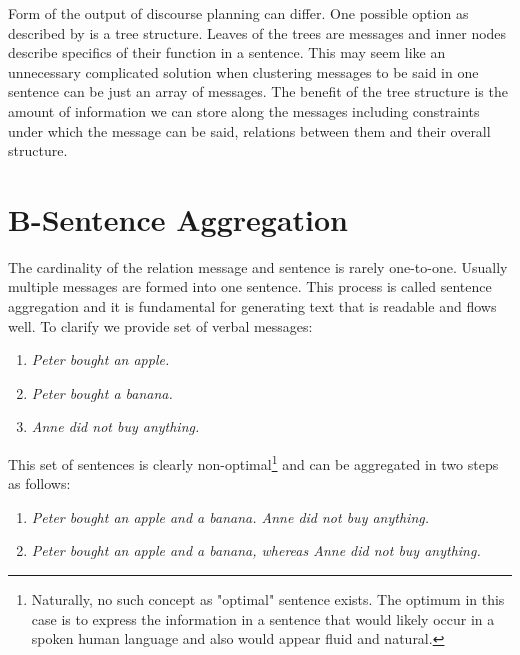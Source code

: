 Form of the output of discourse planning can differ. One possible option as described by \cite{reiter1997building} is a tree structure. Leaves of the trees are messages and inner nodes describe specifics of their function in a sentence. This may seem like an unnecessary complicated solution when clustering messages to be said in one sentence can be just an array of messages. The benefit of the tree structure is the amount of information we can store along the messages including constraints under which the message can be said, relations between them and their overall structure.

\section{B-Sentence Aggregation}
The cardinality of the relation message and sentence is rarely one-to-one. Usually multiple messages are formed into one sentence. This process is called sentence aggregation and it is fundamental for generating text that is readable and flows well. To clarify we provide set of verbal messages:
\begin{enumerate}
	\item \emph{Peter bought an apple.}\label{sa-one}
	\item \emph{Peter bought a banana.}\label{sa-two}
	\item \emph{Anne did not buy anything.}\label{sa-three}	
\end{enumerate}

This set of sentences is clearly non-optimal\footnote{Naturally, no such concept as "optimal" sentence exists. The optimum in this case is to express the information in a sentence that would likely occur in a spoken human language and also would appear fluid and natural.} and can be aggregated in two steps as follows:
\begin{enumerate}[resume]
	\item \emph{Peter bought an apple and a banana. Anne did not buy anything.}\label{sa-four}
	\item \emph{Peter bought an apple and a banana, whereas Anne did not buy anything.}\label{sa-five}	
\end{enumerate}

